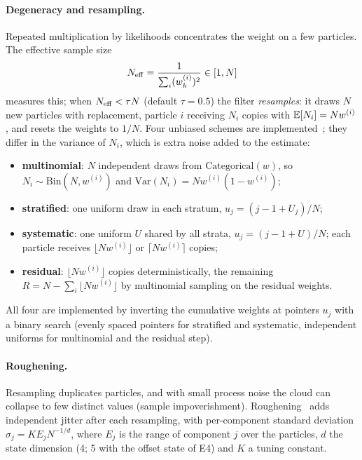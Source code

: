 \paragraph{Degeneracy and resampling.} Repeated multiplication by likelihoods concentrates the
weight on a few particles. The effective sample size
\begin{equation}
  N_{\mathrm{eff}} = \frac{1}{\sum_i (w_k^{(i)})^2} \in [1, N]
\end{equation}
measures this; when $N_{\mathrm{eff}} < \tau N$ (default $\tau = 0.5$) the filter \emph{resamples}: it
draws $N$ new particles with replacement, particle $i$ receiving $N_i$ copies with
$\mathbb{E}[N_i] = N w^{(i)}$, and resets the weights to $1/N$. Four unbiased schemes are
implemented~\cite{hol2006}; they differ in the variance of $N_i$, which is extra noise added to
the estimate:
\begin{itemize}
  \item \textbf{multinomial}: $N$ independent draws from $\mathrm{Categorical}(w)$, so
        $N_i \sim \mathrm{Bin}(N, w^{(i)})$ and $\mathrm{Var}(N_i) = N w^{(i)}(1-w^{(i)})$;
  \item \textbf{stratified}: one uniform draw in each stratum, $u_j = (j - 1 + U_j)/N$;
  \item \textbf{systematic}: one uniform $U$ shared by all strata, $u_j = (j - 1 + U)/N$;
        each particle receives $\lfloor N w^{(i)} \rfloor$ or $\lceil N w^{(i)} \rceil$
        copies;
  \item \textbf{residual}: $\lfloor N w^{(i)} \rfloor$ copies deterministically, the remaining
        $R = N - \sum_i \lfloor N w^{(i)} \rfloor$ by multinomial sampling on the residual
        weights.
\end{itemize}
All four are implemented by inverting the cumulative weights at pointers $u_j$ with a binary
search (evenly spaced pointers for stratified and systematic, independent uniforms for multinomial
and the residual step).

\paragraph{Roughening.} Resampling duplicates particles, and with small process noise the cloud
can collapse to few distinct values (sample impoverishment). Roughening~\cite{gordon1993} adds
independent jitter after each resampling, with per-component standard deviation
$\sigma_j = K E_j N^{-1/d}$, where $E_j$ is the range of component $j$ over the particles, $d$
the state dimension (4; 5 with the offset state of E4) and $K$ a tuning constant.

